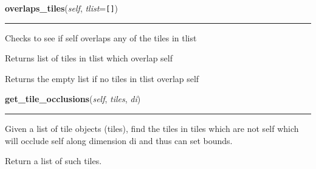     \label{Tiling:Tile:overlaps_tiles}

    \vspace{0.5ex}

\hspace{.8\funcindent}\begin{boxedminipage}{\funcwidth}

    \raggedright \textbf{overlaps\_tiles}(\textit{self}, \textit{tlist}={\tt []})

    \vspace{-1.5ex}

    \rule{\textwidth}{0.5\fboxrule}
\setlength{\parskip}{2ex}
    Checks to see if self overlaps any of the tiles in tlist

    Returns list of tiles in tlist which overlap self

    Returns the empty list if no tiles in tlist overlap self

\setlength{\parskip}{1ex}
    \end{boxedminipage}

    \label{Tiling:Tile:get_tile_occlusions}

    \vspace{0.5ex}

\hspace{.8\funcindent}\begin{boxedminipage}{\funcwidth}

    \raggedright \textbf{get\_tile\_occlusions}(\textit{self}, \textit{tiles}, \textit{di})

    \vspace{-1.5ex}

    \rule{\textwidth}{0.5\fboxrule}
\setlength{\parskip}{2ex}
    Given a list of tile objects (tiles), find the tiles in tiles which are
    not self which will occlude self along dimension di and thus can set 
    bounds.

    Return a list of such tiles.

\setlength{\parskip}{1ex}
    \end{boxedminipage}

    \label{Tiling:Tile:whether_occludes_tile}

    \vspace{0.5ex}

